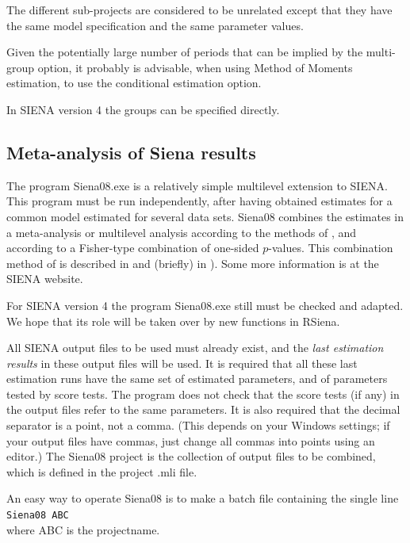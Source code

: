 \documentclass[a4paper,fleqn]{article}
\newcommand{\+}{\, + \,}
\newcommand{\rs}{{\sf RSiena}}
\newcommand{\SI}{{\sf SIENA }}
\newcommand{\si}{{\sf SIENA}}
\begin{document}
{The different sub-projects are considered to be unrelated
except that they have the same model specification and the same
parameter values.

Given the potentially large number of periods that can be implied
by the multi-group option, it probably is advisable,
when using Method of Moments estimation, to use
the conditional estimation option.

In \SI version 4 the groups can be specified directly.



\subsection{Meta-analysis of Siena results}
\label{S_Siena08}

The program \textsf{Siena08.exe} is a relatively simple
multilevel extension to \si.
   This program must be run independently,
   after having obtained estimates for a common model
   estimated for several data sets.
   \textsf{Siena08} combines
   the estimates in a meta-analysis or multilevel analysis
   according to the methods of \citet{SnijdersBaerveldt03},
   and according to a Fisher-type combination of one-sided $p$-values.
   This combination method of \citet{Fisher32} is described in
\citet{HedgesOlkin85}
   and (briefly) in \citet[Chapter 3]{SnijdersBosker99}).
   Some more information is at the \SI website.

   For \SI version 4 the program \textsf{Siena08.exe} still must be
   checked and adapted. We hope that its role will be taken over
   by new functions in \rs.

   All \SI output files to be used must already exist,
   and the \emph{last estimation results} in these output files will be used.
   It is required that all these last estimation runs
   have the same set of estimated parameters, and of
   parameters tested by score tests.
   The program does not check that the score tests (if any)
   in the output files
   refer to the same parameters.
   It is also required that the decimal separator is a point, not a comma.
   (This depends on your Windows settings; if your output files have commas,
   just change all commas into points using an editor.)
   The \textsf{Siena08} project is the collection of output files
   to be combined, which is defined in the project \textsf{.mli} file.

   An easy way to operate \textsf{Siena08} is
    to make a batch file containing the single line
     \smallskip \\
     {\tt Siena08 ABC} \smallskip \\
   where \textsf{ABC} is the projectname.

}
\end{document}
